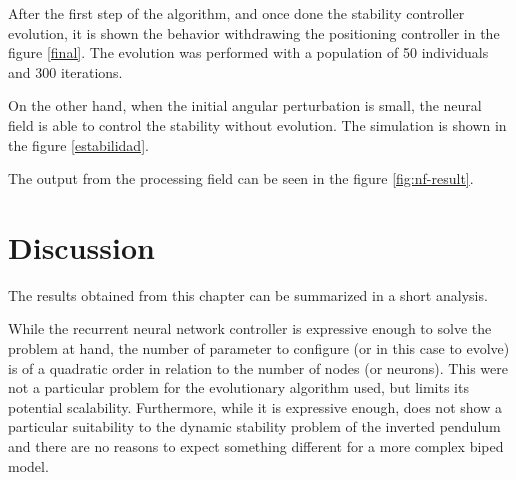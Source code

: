 After the first step of the algorithm, and once done the stability
controller evolution, it is shown the behavior withdrawing the
positioning controller in the figure \ref{final}. The evolution was performed with a population
of 50 individuals and 300 iterations.


On the other hand, when the initial angular perturbation is small, the
neural field is able to control the stability without evolution. The
simulation is shown in the figure \ref{estabilidad}.



The output from the processing field can be seen in the figure
\ref{fig:nf-result}.





\section{Discussion}
The results obtained from this chapter can be summarized in a short
analysis. 

While the recurrent neural network controller is expressive
enough to solve the problem at hand, the number of parameter to
configure (or in this case to evolve) is of a quadratic order in
relation to the number of nodes (or neurons). This were not a
particular problem for the evolutionary algorithm used, but limits its
potential scalability. Furthermore, while it is expressive enough,
does not show a particular suitability to the dynamic stability
problem of the inverted pendulum and there are no reasons to expect
something different for a more complex biped model. 

